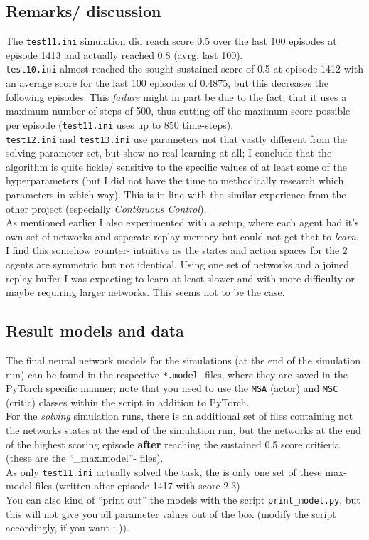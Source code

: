\documentclass[a4paper]{article}
\begin{document}
\subsection{Remarks/ discussion}
The \texttt{test11.ini} simulation did reach score 0.5 over the last 100 episodes
at episode 1413 and actually reached 0.8 (avrg. last 100).
\\
\texttt{test10.ini} almost reached the sought sustained score of 0.5 at episode
1412 with an average score for the last 100 episodes of 0.4875, but this decreases
the following episodes.
This \textit{failure} might in part be due to the fact, that it uses a maximum
number of steps of 500, thus cutting off the maximum score possible per episode
(\texttt{test11.ini} uses up to 850 time-steps).
\\
\texttt{test12.ini} and \texttt{test13.ini} use parameters not that vastly different
from the solving parameter-set, but show no real learning at all; I conclude
that the algorithm is quite fickle/ sensitive to the specific values of at least
some of the hyperparameters (but I did not have the time to methodically
research which parameters in which way). This is in line with the similar
experience from the other project (especially \textit{Continuous Control}).
\\
As mentioned earlier I also experimented with a setup, where each agent had it's
own set of networks and seperate replay-memory but could not get that to \textit{learn}.
I find this somehow counter- intuitive as the states and action spaces for the
2 agents are symmetric but not identical. Using one set of networks and a joined
replay buffer I was expecting to learn at least slower and with more difficulty
or maybe requiring larger networks. This seems not to be the case.

\subsection{Result models and data}
The final neural network models for the simulations (at the end of the simulation run)
can be found in the respective \texttt{*.model}- files, where they are saved
in the PyTorch specific manner; note that you need to use the \texttt{MSA} (actor) and \texttt{MSC} (critic)
classes within the script in addition to PyTorch.\\
For the \textit{solving} simulation runs, there is an additional set of
files containing not the networks states at the end of the simulation run, but
the networks at the end of the highest scoring episode \textbf{after} reaching
the sustained 0.5 score critieria (these are the \enquote{\_max.model}- files).\\
As only \texttt{test11.ini} actually solved the task, the is only one set
of these max- model files (written after episode 1417 with score 2.3)
\\
You can also kind of \enquote{print out} the models with the script
\texttt{print\_model.py}, but this will not give you all parameter values
out of the box (modify the script accordingly, if you want :-)).
\\
\end{document}
